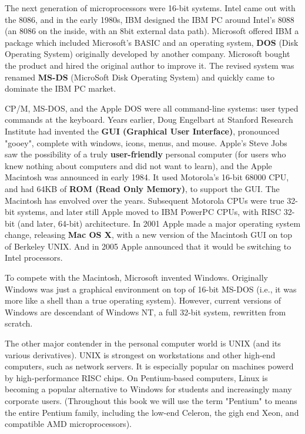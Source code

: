 \documentclass{book}
\newcommand {\kw}  [1] {\textbf{#1}}
\begin{document}
The next generation of microprocessors were 16-bit systems.
Intel came out with the 8086, and in the early 1980s, IBM designed the IBM PC around Intel's 8088 (an 8086 on the inside, with an 8bit external data path).
Microsoft offered IBM a package which included Microsoft's BASIC and an operating system, 
\kw{DOS} (Disk Operating System) originally developed by another company.
Microsoft bought the product and hired the original author to improve it.
The revised system was renamed \kw{MS-DS} (MicroSoft Disk Operating System) and quickly came to dominate the IBM PC market.

CP/M, MS-DOS, and the Apple DOS were all command-line systems: user typed commands at the keyboard.
Years earlier, Doug Engelbart at Stanford Research Institute had invented the \kw{GUI (Graphical User Interface)}, pronounced "gooey", 
complete with windows, icons, menus, and mouse.
Apple's Steve Jobs saw the possibility of a truly \kw{user-friendly} personal computer 
(for users who knew nothing about computers and did not want to learn), and the Apple Macintosh was announced in early 1984.
It used Motorola's 16-bit 68000 CPU, and had 64KB of \kw{ROM (Read Only Memory)}, to support the GUI.
The Macintosh has envolved over the years.
Subsequent Motorola CPUs were true 32-bit systems, and later still Apple moved to IBM PowerPC CPUs, with RISC 32-bit (and later, 64-bit) architecture.
In 2001 Apple made a major operating system change, releasing \kw{Mac OS X}, with a new version of the Macintosh GUI on top of Berkeley UNIX.
And in 2005 Apple announced that it would be switching to Intel processors.

To compete with the Macintosh, Microsoft invented Windows.
Originally Windows was just a graphical environment on top of 16-bit MS-DOS (i.e., it was more like a shell than a true operating system).
However, current versions of Windows are descendant of Windows NT, a full 32-bit system, rewritten from scratch.

The other major contender in the personal computer world is UNIX (and its various derivatives).
UNIX is strongest on workstations and other high-end computers, such as network servers.
It is especially popular on machines powerd by high-performance RISC chips.
On Pentium-based computers, Linux is becoming a popular alternative to Windows for students and increasingly many corporate users.
(Throughout this book we will use the term "Pentium" to means the entire Pentium family, 
including the low-end Celeron, the gigh end Xeon, and compatible AMD microprocessors).
\end{document}
